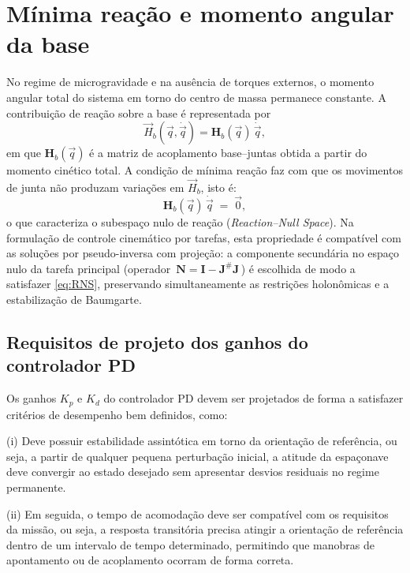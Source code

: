 \section{Mínima reação e momento angular da base}

No regime de microgravidade e na ausência de torques externos, o momento angular total do sistema em torno do centro de massa permanece constante. 
A contribuição de reação sobre a base é representada por
\begin{equation}
\vec H_b(\vec q,\dot{\vec q})
=
\mathbf H_b(\vec q)\,\dot{\vec q},
\label{eq:MomentoBase}
\end{equation}
em que $\mathbf H_b(\vec q)$ é a matriz de acoplamento base--juntas obtida a partir do momento cinético total. 
A condição de mínima reação faz com que os movimentos de junta não produzam variações em $\vec H_b$, isto é:
\begin{equation}
\mathbf H_b(\vec q)\,\dot{\vec q} \;=\; \vec 0,
\label{eq:RNS}
\end{equation}
o que caracteriza o subespaço nulo de reação
(\emph{Reaction--Null Space}). 
Na formulação de controle cinemático por tarefas, esta propriedade é compatível com as soluções por pseudo-inversa com projeção:
a componente secundária no espaço nulo da tarefa principal (operador $\,\mathbf N=\mathbf I-\mathbf J^\#\mathbf J\,$)
é escolhida de modo a satisfazer
\eqref{eq:RNS}, preservando simultaneamente as restrições holonômicas e a estabilização de Baumgarte.


\subsection{Requisitos de projeto dos ganhos do controlador PD}
Os ganhos $K_p$ e $K_d$ do controlador PD devem ser projetados de forma a satisfazer critérios de desempenho bem definidos, como:

(i) Deve possuir estabilidade assintótica em torno da orientação de referência, ou seja, a partir de qualquer pequena perturbação inicial, a atitude da espaçonave deve convergir ao estado desejado sem apresentar desvios residuais no regime permanente.

(ii) Em seguida, o tempo de acomodação deve ser compatível com os requisitos da missão, ou seja, a resposta transitória precisa atingir a orientação de referência dentro de um intervalo de tempo determinado, permitindo que manobras de apontamento ou de acoplamento ocorram de forma correta.

